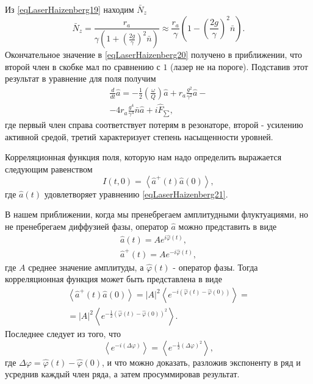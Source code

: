 Из \eqref{eqLaserHaizenberg19} находим $\bar{N}_z$
\begin{equation}
\bar{N}_z = \frac{r_a}{\gamma\left(1+ \left(\frac{2
    g}{\gamma}\right)^2 \bar{n}\right)} 
\approx
\frac{r_a}{\gamma}
\left(1 - \left(\frac{2 g}{\gamma}\right)^2
\bar{n}\right).
\label{eqLaserHaizenberg20}
\end{equation}
Окончательное значение в \eqref{eqLaserHaizenberg20} получено в
приближении, что второй член в скобке мал по сравнению с $1$ (лазер не
на пороге). Подставив этот результат в уравнение для поля получим
\begin{eqnarray}
\frac{d}{dt}\hat{a} = -\frac{1}{2}\left(\frac{\omega}{Q}\right)\hat{a}
+ r_a \frac{g^2}{\gamma^2}\hat{a} - 
\nonumber \\
- 4 r_a\frac{g^4}{\gamma^4} \bar{n}\hat{a} + i \hat{F}_{\sum},
\label{eqLaserHaizenberg21}
\end{eqnarray}
где первый член справа соответствует потерям в резонаторе, второй -
усилению активной средой, третий характеризует степень насыщенности
уровней. 

Корреляционная функция поля, которую нам надо определить выражается
следующим равенством
\begin{equation}
I\left(t, 0\right) = \left<\hat{a}^{+}\left(t\right)\hat{a}\left(0\right)\right>,
\nonumber
\end{equation}
где $\hat{a}\left(t\right)$ удовлетворяет уравнению
\eqref{eqLaserHaizenberg21}. 

В нашем приближении, когда мы пренебрегаем амплитудными флуктуациями,
но не пренебрегаем диффузией фазы, оператор $\hat{a}$ можно
представить в виде
\begin{eqnarray}
\hat{a}\left(t\right) = A e^{i\hat{\varphi}\left(t\right)},
\nonumber \\
\hat{a}^{+}\left(t\right) = A e^{-i\hat{\varphi}\left(t\right)},
\label{eqLaserHaizenbergAConstPhi}
\end{eqnarray}
где $A$ среднее значение амплитуды, а $\hat{\varphi}\left(t\right)$ -
оператор фазы. Тогда корреляционная функция может быть представлена в
виде 
\begin{eqnarray}
\left<\hat{a}^{+}\left(t\right)\hat{a}\left(0\right)\right> =
\left|A\right|^2 \left<e^{-i\left(\hat{\varphi}\left(t\right) -
  \hat{\varphi}\left(0\right)\right)}\right> = 
\nonumber \\
= 
\left|A\right|^2 \left<e^{-\frac{1}{2}\left(\hat{\varphi}\left(t\right) -
  \hat{\varphi}\left(0\right)\right)^2}\right>.
\label{eqLaserHaizenbergTaskMiddle}
\end{eqnarray}
Последнее следует из того, что 
\begin{equation}
\left<e^{-i \left(\Delta \varphi\right)}\right> = 
\left<e^{-\frac{1}{2} \left(\Delta \varphi\right)^2}\right>,
\nonumber
\end{equation}
где $\Delta \varphi = \hat{\varphi}\left(t\right) -
\hat{\varphi}\left(0\right)$, и что можно доказать, разложив
экспоненту в ряд и усреднив каждый член ряда, а затем просуммировав
результат.

